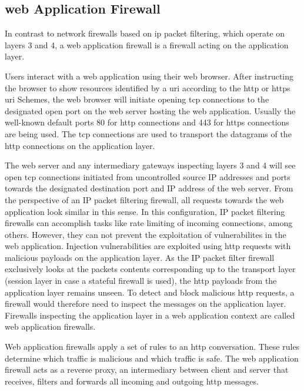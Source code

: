 \subsection{web Application Firewall}
\label{sec:waf}
In contrast to network firewalls based on \acrfull{ip} packet filtering, which operate on layers 3 and 4, a web application firewall is a firewall acting on the application layer.

Users interact with a web application using their web browser.
After instructing the browser to show resources identified by a \acrfull{uri} according to the http or https \acrshort{uri} Schemes, the web browser will initiate opening \acrfull{tcp} connections to the designated open port on the web server hosting the web application.
Usually the well-known default ports 80 for \acrfull{http} connections and 443 for \acrfull{https} connections are being used.
The \acrshort{tcp} connections are used to transport the datagrams of the \acrshort{http} connections on the application layer. \cite{rfc7230}

The web server and any intermediary gateways inspecting layers 3 and 4 will see open \acrshort{tcp} connections initiated from uncontrolled source IP addresses and ports towards the designated destination port and IP address of the web server.
From the perspective of an IP packet filtering firewall, all requests towards the web application look similar in this sense.
In this configuration, IP packet filtering firewalls can accomplish tasks like rate limiting of incoming connections, among others.
However, they can not prevent the exploitation of vulnerabilites in the web application.
Injection vulnerabilities are exploited using \acrshort{http} requests with malicious payloads on the application layer.
As the IP packet filter firewall exclusively looks at the packets contents corresponding up to the transport layer (session layer in case a stateful firewall is used), the \acrshort{http} payloads from the application layer remains unseen.
To detect and block malicious \acrshort{http} requests, a firewall would therefore need to inspect the messages on the application layer. Firewalls inspecting the application layer in a web application context are called web application firewalls.

Web application firewalls apply a set of rules to an \acrshort{http} conversation.
These rules determine which traffic is malicious and which traffic is safe.
The web application firewall acts as a reverse proxy, an intermediary between client and server that receives, filters and forwards all incoming and outgoing \acrshort{http} messages. \cite{OWASP/waf,f5/waf}

